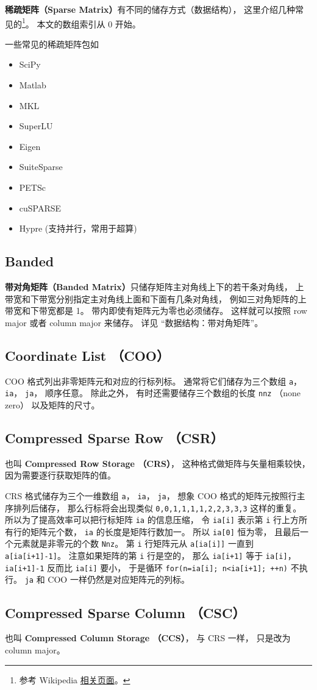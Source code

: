 
\textbf{稀疏矩阵（Sparse Matrix）}有不同的储存方式（数据结构）， 这里介绍几种常见的\footnote{参考 Wikipedia \href{https://en.wikipedia.org/wiki/Sparse_matrix}{相关页面}。}。 本文的数组索引从 0 开始。

一些常见的稀疏矩阵包如
\begin{itemize}
\item SciPy
\item Matlab
\item MKL
\item SuperLU
\item Eigen
\item SuiteSparse
\item PETSc
\item cuSPARSE
\item Hypre (支持并行，常用于超算)




\end{itemize}


\subsection{Banded}
\textbf{带对角矩阵（Banded Matrix）}只储存矩阵主对角线上下的若干条对角线， 上带宽和下带宽分别指定主对角线上面和下面有几条对角线， 例如三对角矩阵的上带宽和下带宽都是 1。 带内即使有矩阵元为零也必须储存。 这样就可以按照 row major 或者 column major 来储存。 详见 “数据结构：带对角矩阵”。

\subsection{Coordinate List （COO）}
COO 格式列出非零矩阵元和对应的行标列标。 通常将它们储存为三个数组 \verb|a|， \verb|ia|， \verb|ja|， 顺序任意。 除此之外， 有时还需要储存三个数组的长度 \verb|nnz| （none zero） 以及矩阵的尺寸。

\subsection{Compressed Sparse Row （CSR）}\label{sub_SprMat_3}
也叫 \textbf{Compressed Row Storage （CRS）}， 这种格式做矩阵与矢量相乘较快，因为需要逐行获取矩阵的值。

CRS 格式储存为三个一维数组 \verb|a|， \verb|ia|， \verb|ja|， 想象 COO 格式的矩阵元按照行主序排列后储存， 那么行标将会出现类似 \verb|0,0,1,1,1,1,2,2,3,3,3| 这样的重复。 所以为了提高效率可以把行标矩阵 \verb|ia| 的信息压缩， 令 \verb|ia[i]| 表示第 \verb|i| 行上方所有行的矩阵元个数， \verb|ia| 的长度是矩阵行数加一。 所以 \verb|ia[0]| 恒为零， 且最后一个元素就是非零元的个数 \verb|Nnz|。 第 \verb|i| 行矩阵元从 \verb|a[ia[i]]| 一直到 \verb|a[ia[i+1]-1]|。 注意如果矩阵的第 \verb|i| 行是空的， 那么 \verb|ia[i+1]| 等于 \verb|ia[i]|， \verb|ia[i+1]-1| 反而比 \verb|ia[i]| 要小， 于是循环 \verb|for(n=ia[i]; n<ia[i+1]; ++n)| 不执行。 \verb|ja| 和 COO 一样仍然是对应矩阵元的列标。

\subsection{Compressed Sparse Column （CSC）}
也叫 \textbf{Compressed Column Storage （CCS）}， 与 CRS 一样， 只是改为 column major。
